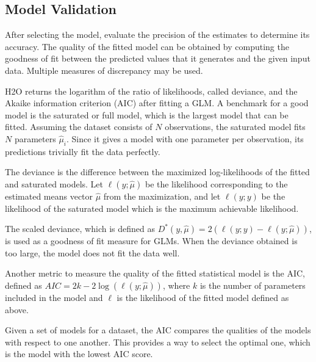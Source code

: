 \subsection{Model Validation}

After selecting the model, evaluate the precision of the estimates to determine its accuracy. The quality of the fitted model can be obtained by computing the goodness of fit between the predicted values that it generates and the given input data. Multiple measures of discrepancy may be used. 
\nowidow[3]

H2O returns the logarithm of the ratio of likelihoods, called deviance, and the Akaike information criterion (AIC) after fitting a GLM. A benchmark for a good model is the saturated or full model, which is the largest model that can be fitted. Assuming the dataset consists of $N$ observations, the saturated model fits $N$ parameters $\hat{\mu}_i$. Since it gives a model with one parameter per observation, its predictions trivially fit the data perfectly.

The deviance is the difference between the maximized log-likelihoods of the fitted and saturated models. Let $\ell(y;\hat{\mu})$ be the likelihood corresponding to the estimated means vector $\hat{\mu}$ from the maximization, and let $\ell(y;y)$ be the likelihood of the saturated model which is the maximum achievable likelihood. 

The scaled deviance, which is defined as $ D^*(y,\hat{\mu}) = 2 (\ell(y;y)-\ell(y;\hat{\mu}) )$,
is used as a goodness of fit measure for GLMs. When the deviance obtained is too large, the model does not fit the data well. 

%

Another metric to measure the quality of the fitted statistical model is the AIC, defined as $AIC = 2k -2\log(\ell(y;\hat{\mu}))$, where $k$ is the number of parameters included in the model and $\ell$ is the likelihood of the fitted model defined as above.

 Given a set of models for a dataset, the AIC compares the qualities of the models with respect to one another. This provides a way to select the optimal one, which is the model with the lowest AIC score. 

